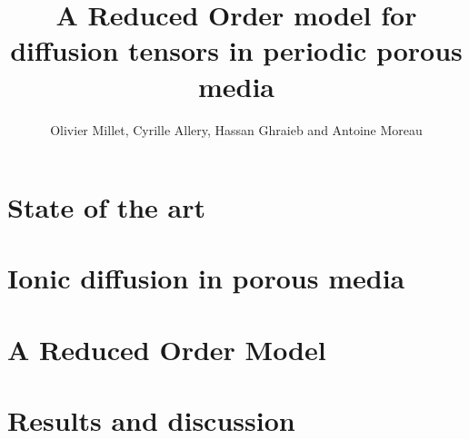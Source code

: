 \documentclass[a4paper,10pt]{article}
\title{A Reduced Order model for diffusion tensors in periodic porous media}
\author{Olivier Millet, Cyrille Allery, Hassan Ghraieb and Antoine Moreau}
\begin{document}


\maketitle

\begin{abstract}

\end{abstract}

%
\section{State of the art}\label{st_a}


\section{Ionic diffusion in porous media}\label{hom_d}


\section{A Reduced Order Model}\label{rom}


%

\section{Results and discussion}\label{res}



%



\end{document}
